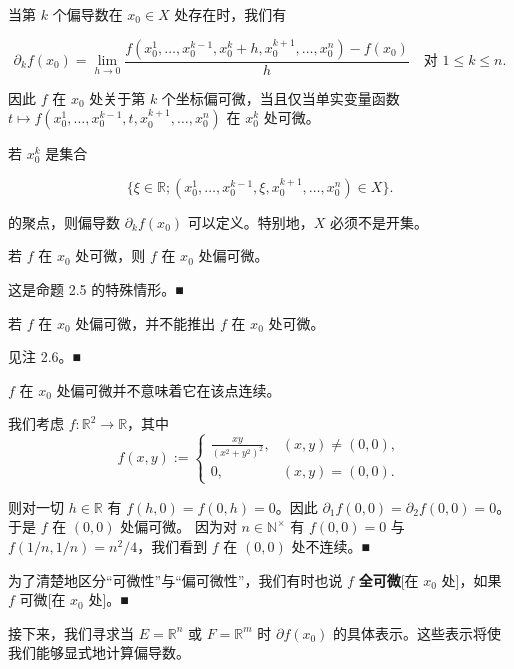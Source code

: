 \begin{remark}

\begin{items}
\item

当第 $ k $ 个偏导数在 $ x_0 \in X $ 处存在时，我们有

\[
\partial_k f(x_0) = \lim_{h \to 0} \frac{f(x_0^1, \ldots, x_0^{k-1}, x_0^k + h, x_0^{k+1}, \ldots, x_0^n) - f(x_0)}{h} \quad \text{对 } 1 \le k \le n .
\]

因此 $ f $ 在 $ x_0 $ 处关于第 $ k $ 个坐标偏可微，当且仅当单实变量函数 $ t \mapsto f(x_0^1, \ldots, x_0^{k-1}, t, x_0^{k+1}, \ldots, x_0^n) $ 在 $ x_0^k $ 处可微。

\item

若 $ x_0^k $ 是集合

\[
\{ \xi \in \mathbb{R} ; (x_0^1, \ldots, x_0^{k-1}, \xi, x_0^{k+1}, \ldots, x_0^n) \in X \} .
\]

的聚点，则偏导数 $ \partial_k f(x_0) $ 可以定义。特别地，$ X $ 必须不是开集。

\item

若 $ f $ 在 $ x_0 $ 处可微，则 $ f $ 在 $ x_0 $ 处偏可微。

\proofhead
这是命题 2.5 的特殊情形。\nobreak\hspace{0.35em}■
\item

若 $ f $ 在 $ x_0 $ 处偏可微，并不能推出 $ f $ 在 $ x_0 $ 处可微。

\proofhead
见注 2.6。\nobreak\hspace{0.35em}■
\item

$ f $ 在 $ x_0 $ 处偏可微并不意味着它在该点连续。

\proofhead
我们考虑 $ f : \mathbb{R}^2 \to \mathbb{R} $，其中
\begin{equation*}
f(x,y) := \begin{cases} \frac{xy}{(x^2 + y^2)^2} , & (x,y) \ne (0,0) , \\ 0 , & (x,y) = (0,0) . \end{cases}
\end{equation*}

则对一切 $ h \in \mathbb{R} $ 有 $ f(h,0) = f(0,h) = 0 $。因此 $ \partial_1 f(0,0) = \partial_2 f(0,0) = 0 $。于是 $ f $ 在 $ (0,0) $ 处偏可微。
因为对 $ n \in \mathbb{N}^{\times} $ 有 $ f(0,0) = 0 $ 与 $ f(1/n, 1/n) = n^2/4 $，我们看到 $ f $ 在 $ (0,0) $ 处不连续。\nobreak\hspace{0.35em}■

\item

为了清楚地区分“可微性”与“偏可微性”，我们有时也说 $ f $ \textbf{全可微}[在 $ x_0 $ 处]，如果 $ f $ 可微[在 $ x_0 $ 处]。\nobreak\hspace{0.35em}■

\end{items}

接下来，我们寻求当 $ E = \mathbb{R}^n $ 或 $ F = \mathbb{R}^m $ 时 $ \partial f(x_0) $ 的具体表示。这些表示将使我们能够显式地计算偏导数。

\end{remark}

